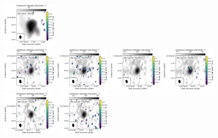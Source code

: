 \begin{figure}[htbp!]
  \includegraphics[width=0.24\textwidth]{./moment0/Set3_ID04_CH3CN_257527.pdf}
  \\
  \includegraphics[width=0.24\textwidth]{./moment0/Set3_ID02_CH3OH_243915.pdf}
  \includegraphics[width=0.24\textwidth]{./moment0/Set3_ID02_CH3OCHO_259342.pdf}
  \includegraphics[width=0.24\textwidth]{./moment0/Set3_ID02_CH3OCH3_259311.pdf}
  \includegraphics[width=0.24\textwidth]{./moment0/Set3_ID02_CH3CN_257527.pdf}
  \\
  \includegraphics[width=0.24\textwidth]{./moment0/Set3_ID03_CH3OH_243915.pdf}
  \includegraphics[width=0.24\textwidth]{./moment0/Set3_ID03_CH3OCHO_259342.pdf}

\end{figure}
